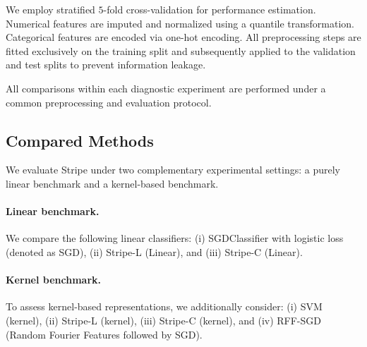 \documentclass[a4paper,fleqn]{cas-sc}
\begin{document}
We employ stratified $5$-fold cross-validation for performance estimation. Numerical features are imputed and normalized using a quantile transformation. Categorical features are encoded via one-hot encoding. All preprocessing steps are fitted exclusively on the training split and subsequently applied to the validation and test splits to prevent information leakage.

All comparisons within each diagnostic experiment are performed under a common preprocessing and evaluation protocol.







\subsection{Compared Methods}

We evaluate Stripe under two complementary experimental settings: a purely linear benchmark and a kernel-based benchmark. 

\paragraph{Linear benchmark.} We compare the following linear classifiers: (i) SGDClassifier with logistic loss (denoted as SGD), (ii) Stripe-L (Linear), and (iii) Stripe-C (Linear). 

\paragraph{Kernel benchmark.} To assess kernel-based representations, we additionally consider: (i) SVM (kernel), (ii) Stripe-L (kernel), (iii) Stripe-C (kernel), and (iv) RFF-SGD (Random Fourier Features followed by SGD).
\end{document}
